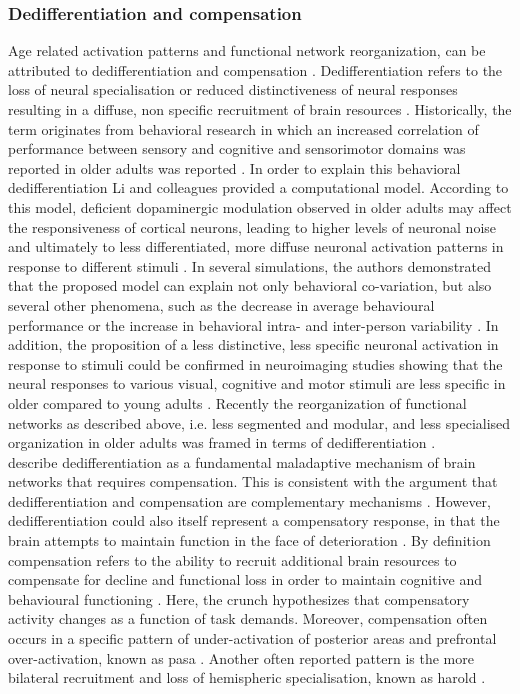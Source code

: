 \subsubsection{Dedifferentiation and compensation}
\label{theory:aging:dedif}
Age related activation patterns and functional network reorganization, can be attributed to dedifferentiation and compensation \cite{Grady2012}. Dedifferentiation refers to the loss of neural specialisation or reduced distinctiveness of neural responses resulting in a diffuse, non specific recruitment of brain resources \cite{Koen2019}. Historically, the term originates from behavioral research in which an increased correlation of performance between sensory and cognitive and sensorimotor domains was reported in older adults was reported \cite{Baltes1997,Li2002}. In order to explain this behavioral dedifferentiation Li and colleagues \cite{Li2001, Li2002} provided a computational model. According to this model, deficient dopaminergic modulation observed in older adults may affect the responsiveness of cortical neurons, leading to higher levels of neuronal noise and ultimately to less differentiated, more diffuse neuronal activation patterns in response to different stimuli \cite{Li2001,Li2002}. In several simulations, the authors demonstrated that the proposed model can explain not only behavioral co-variation, but also several other phenomena, such as the decrease in average behavioural performance or the increase in behavioral intra- and inter-person variability \cite{Li2000,Li2002}. In addition, the proposition of a less distinctive, less specific neuronal activation in response to stimuli could be confirmed in neuroimaging studies showing that the neural responses to various visual, cognitive and motor stimuli are less specific in older compared to young adults \cite{Tucker2019, Koen2019,Carb2011}. Recently the reorganization of functional networks as described above, i.e. less segmented and modular, and less specialised organization in older adults was framed in terms of dedifferentiation \cite{Deery2023, Koen2019, Sala-Llonch2015}.\\
\citeauthor{Fornito2015}\cite{Fornito2015} describe dedifferentiation as a fundamental maladaptive mechanism of brain networks that requires compensation. This is consistent with the argument that dedifferentiation and compensation are complementary mechanisms \cite{Reuter-Lorenz2010}. However, dedifferentiation could also itself represent a compensatory response, in that the brain attempts to maintain function in the face of deterioration \cite{Stern2009}. By definition compensation refers to the ability to recruit additional brain resources to compensate for decline and functional loss in order to maintain cognitive and behavioural functioning \cite{Reuter-Lorenz2010, Grady2012}. Here, the \gls{crunch} hypothesizes that compensatory activity changes as a function of task demands. Moreover, compensation often occurs in a specific pattern of under-activation of posterior areas and prefrontal over-activation, known as \gls{pasa} \cite{Davis2007}. Another often reported pattern is the more bilateral recruitment and loss of hemispheric specialisation, known as \gls{harold} \cite{Cabeza2002}.

